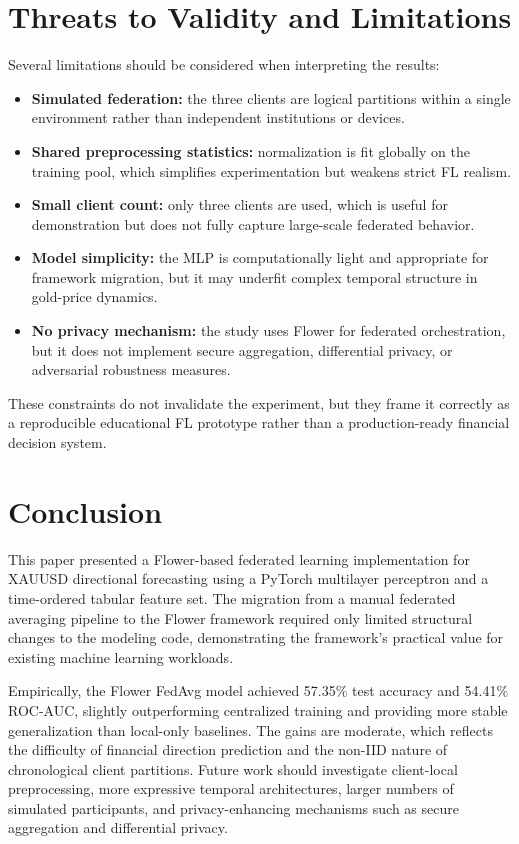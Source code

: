 \documentclass[conference]{IEEEtran}
\begin{document}
\section{Threats to Validity and Limitations}
Several limitations should be considered when interpreting the results:
\begin{itemize}
    \item \textbf{Simulated federation:} the three clients are logical partitions within a single environment rather than independent institutions or devices.
    \item \textbf{Shared preprocessing statistics:} normalization is fit globally on the training pool, which simplifies experimentation but weakens strict FL realism.
    \item \textbf{Small client count:} only three clients are used, which is useful for demonstration but does not fully capture large-scale federated behavior.
    \item \textbf{Model simplicity:} the MLP is computationally light and appropriate for framework migration, but it may underfit complex temporal structure in gold-price dynamics.
    \item \textbf{No privacy mechanism:} the study uses Flower for federated orchestration, but it does not implement secure aggregation, differential privacy, or adversarial robustness measures.
\end{itemize}

These constraints do not invalidate the experiment, but they frame it correctly as a reproducible educational FL prototype rather than a production-ready financial decision system.

\section{Conclusion}
This paper presented a Flower-based federated learning implementation for XAUUSD directional forecasting using a PyTorch multilayer perceptron and a time-ordered tabular feature set. The migration from a manual federated averaging pipeline to the Flower framework required only limited structural changes to the modeling code, demonstrating the framework's practical value for existing machine learning workloads.

Empirically, the Flower FedAvg model achieved 57.35\% test accuracy and 54.41\% ROC-AUC, slightly outperforming centralized training and providing more stable generalization than local-only baselines. The gains are moderate, which reflects the difficulty of financial direction prediction and the non-IID nature of chronological client partitions. Future work should investigate client-local preprocessing, more expressive temporal architectures, larger numbers of simulated participants, and privacy-enhancing mechanisms such as secure aggregation and differential privacy.
\end{document}
